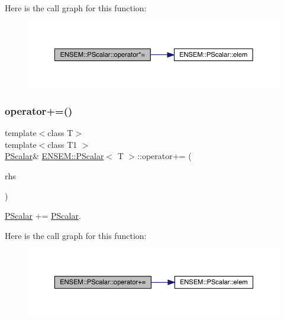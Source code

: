Here is the call graph for this function\+:
\nopagebreak
\begin{figure}[H]
\begin{center}
\leavevmode
\includegraphics[width=350pt]{d3/d27/classENSEM_1_1PScalar_addccfa9164f9d80554657387932185c4_cgraph}
\end{center}
\end{figure}
\mbox{\label{classENSEM_1_1PScalar_a9c8d9e51f9d0a13b4b4aa9992812eea8}} 
\subsubsection{\texorpdfstring{operator+=()}{operator+=()}\hspace{0.1cm}{\footnotesize\ttfamily [1/3]}}
{\footnotesize\ttfamily template$<$class T$>$ \\
template$<$class T1 $>$ \\
\mbox{\hyperlink{classENSEM_1_1PScalar}{P\+Scalar}}\& \mbox{\hyperlink{classENSEM_1_1PScalar}{E\+N\+S\+E\+M\+::\+P\+Scalar}}$<$ T $>$\+::operator+= (\begin{DoxyParamCaption}\item[{const \mbox{\hyperlink{classENSEM_1_1PScalar}{P\+Scalar}}$<$ T1 $>$ \&}]{rhs }\end{DoxyParamCaption})\hspace{0.3cm}{\ttfamily [inline]}}



\mbox{\hyperlink{classENSEM_1_1PScalar}{P\+Scalar}} += \mbox{\hyperlink{classENSEM_1_1PScalar}{P\+Scalar}}. 

Here is the call graph for this function\+:
\nopagebreak
\begin{figure}[H]
\begin{center}
\leavevmode
\includegraphics[width=350pt]{d3/d27/classENSEM_1_1PScalar_a9c8d9e51f9d0a13b4b4aa9992812eea8_cgraph}
\end{center}
\end{figure}
\mbox{\label{classENSEM_1_1PScalar_a9c8d9e51f9d0a13b4b4aa9992812eea8}} 
